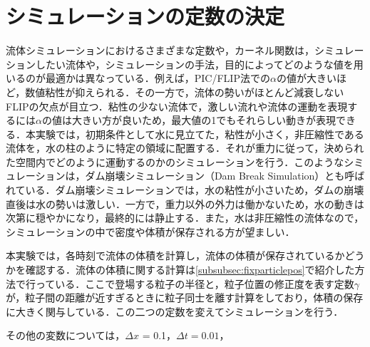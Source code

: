 \documentclass[a4j,12pt]{jreport}
\begin{document}
\section{シミュレーションの定数の決定} \label{sec:constant}
流体シミュレーションにおけるさまざまな定数や，カーネル関数は，シミュレーションしたい流体や，シミュレーションの手法，目的によってどのような値を用いるのが最適かは異なっている．例えば，PIC/FLIP法での$\alpha$の値が大きいほど，数値粘性が抑えられる．その一方で，流体の勢いがほとんど減衰しないFLIPの欠点が目立つ．粘性の少ない流体で，激しい流れや流体の運動を表現するには$\alpha$の値は大きい方が良いため，最大値の1でもそれらしい動きが表現できる．本実験では，初期条件として水に見立てた，粘性が小さく，非圧縮性である流体を，水の柱のように特定の領域に配置する．それが重力に従って，決められた空間内でどのように運動するのかのシミュレーションを行う．このようなシミュレーションは，ダム崩壊シミュレーション（Dam Break Simulation）とも呼ばれている．ダム崩壊シミュレーションでは，水の粘性が小さいため，ダムの崩壊直後は水の勢いは激しい．一方で，重力以外の外力は働かないため，水の動きは次第に穏やかになり，最終的には静止する．また，水は非圧縮性の流体なので，シミュレーションの中で密度や体積が保存される方が望ましい．

本実験では，各時刻で流体の体積を計算し，流体の体積が保存されているかどうかを確認する．流体の体積に関する計算は\ref{subsubsec:fixparticlepos}で紹介した方法で行っている．ここで登場する粒子の半径と，粒子位置の修正度を表す定数$\gamma$が，粒子間の距離が近すぎるときに粒子同士を離す計算をしており，体積の保存に大きく関与している．この二つの定数を変えてシミュレーションを行う．

その他の変数については，$\varDelta x$ = 0.1，$\varDelta t = 0.01$，
\end{document}
